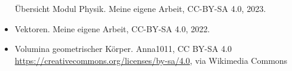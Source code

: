 \documentclass{beamer}
\begin{document}
\begin{frame}
\begin{tiny}
\begin{itemize}
Übersicht Modul Physik. Meine eigene Arbeit, CC-BY-SA 4.0, 2023. 
\item
Vektoren. Meine eigene Arbeit, CC-BY-SA 4.0, 2022.
\item
Volumina geometrischer Körper. Anna1011, CC BY-SA 4.0 \url{https://creativecommons.org/licenses/by-sa/4.0}, via Wikimedia Commons

\end{itemize}

\end{tiny}
\end{frame}
\end{document}
